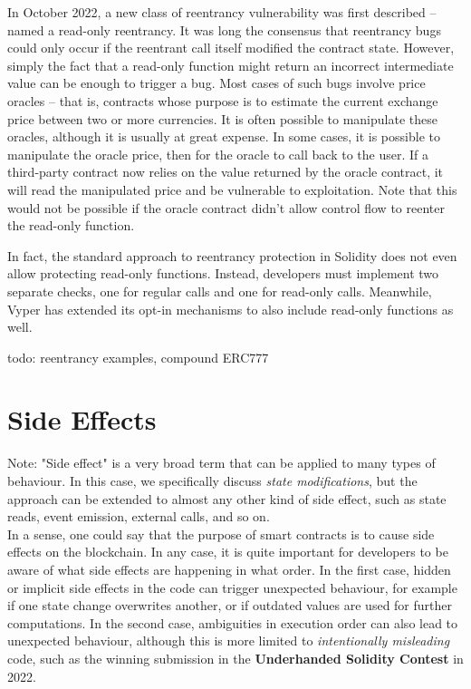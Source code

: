 In October 2022, a new class of reentrancy vulnerability was first described -- named a read-only reentrancy. It was long the consensus that reentrancy bugs could only occur if the reentrant call itself modified the contract state. However, simply the fact that a read-only function might return an incorrect intermediate value can be enough to trigger a bug. Most cases of such bugs involve price oracles -- that is, contracts whose purpose is to estimate the current exchange price between two or more currencies. It is often possible to manipulate these oracles, although it is usually at great expense. In some cases, it is possible to manipulate the oracle price, then for the oracle to call back to the user. If a third-party contract now relies on the value returned by the oracle contract, it will read the manipulated price and be vulnerable to exploitation. Note that this would not be possible if the oracle contract didn't allow control flow to reenter the read-only function.

In fact, the standard approach to reentrancy protection in Solidity does not even allow protecting read-only functions. Instead, developers must implement two separate checks, one for regular calls and one for read-only calls. Meanwhile, Vyper has extended its opt-in mechanisms to also include read-only functions as well.

todo: reentrancy examples, compound ERC777


\section{Side Effects}

Note: "Side effect" is a very broad term that can be applied to many types of behaviour. In this case, we specifically discuss \textit{state modifications}, but the approach can be extended to almost any other kind of side effect, such as state reads, event emission, external calls, and so on.\\
In a sense, one could say that the purpose of smart contracts is to cause side effects on the blockchain. In any case, it is quite important for developers to be aware of what side effects are happening in what order. In the first case, hidden or implicit side effects in the code can trigger unexpected behaviour, for example if one state change overwrites another, or if outdated values are used for further computations. In the second case, ambiguities in execution order can also lead to unexpected behaviour, although this is more limited to \textit{intentionally misleading} code, such as the winning submission in the \textbf{Underhanded Solidity Contest} in 2022.

